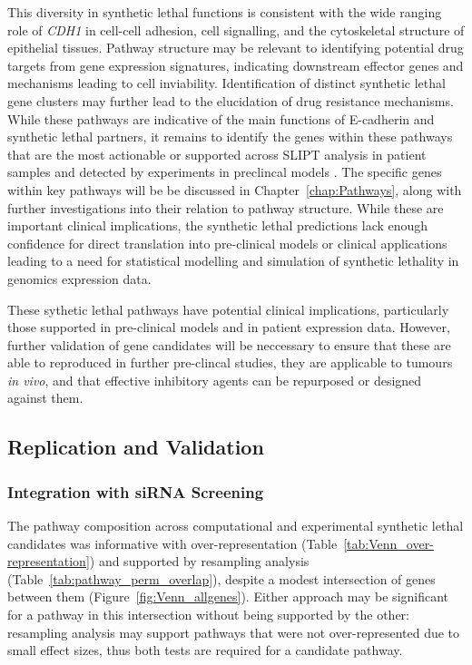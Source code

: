 This diversity in synthetic lethal functions is consistent with the wide ranging role of \textit{CDH1} in cell-cell adhesion, cell signalling, and the cytoskeletal structure of epithelial tissues. Pathway structure may be relevant to identifying potential drug targets from gene expression signatures, indicating downstream effector genes and mechanisms leading to cell inviability. Identification of distinct synthetic lethal gene clusters may further lead to the elucidation of drug resistance mechanisms. While these pathways are indicative of the main functions of E-cadherin and synthetic lethal partners, it remains to identify the genes within these pathways that are the most actionable or supported across \gls{SLIPT} analysis in patient samples and detected by experiments in preclincal models \citep{Chen2014, Telford2015}.  The specific genes within key pathways will be be discussed in Chapter~\ref{chap:Pathways}, along with further investigations into their relation to pathway structure.  While these are important clinical implications, the synthetic lethal predictions lack enough confidence for direct translation into pre-clinical models or clinical applications leading to a need for statistical modelling and simulation of synthetic lethality in genomics expression data.

These sythetic lethal pathways have potential clinical implications, particularly those supported in pre-clinical models and in patient expression data. However, further validation of gene candidates will be neccessary to ensure that these are able to reproduced in further pre-clincal studies, they are applicable to tumours \textit{in vivo}, and that effective inhibitory agents can be repurposed or designed against them.

\subsection{Replication and Validation}

\subsubsection{Integration with siRNA Screening}

The pathway composition across computational and experimental synthetic lethal candidates was informative with over-represent\-ation (Table~\ref{tab:Venn_over-representation}) and supported by resampling analysis (Table~\ref{tab:pathway_perm_overlap}), despite a modest intersection of genes between them (Figure~\ref{fig:Venn_allgenes}). Either approach may be significant for a pathway in this intersection without being supported by the other: resampling analysis may support pathways that were not over-represent\-ed due to small effect sizes, thus both tests are required for a candidate pathway.

